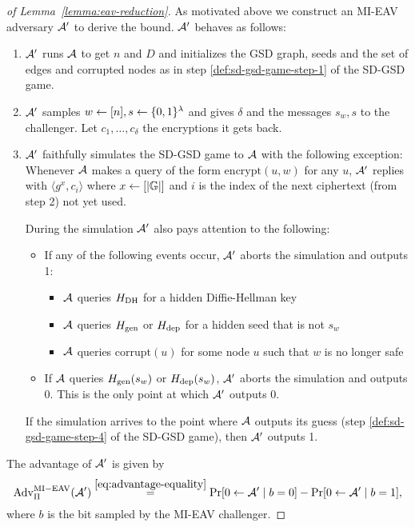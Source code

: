 \begin{proof}[of Lemma~\ref{lemma:eav-reduction}]
	As motivated above we construct an MI-EAV adversary $\mathcal{A}'$ to derive the bound. $\mathcal{A}'$ behaves as follows:
	\begin{enumerate}[1.]
		\item $\mathcal{A}'$ runs $\mathcal{A}$ to get $n$ and $D$ and initializes the GSD graph, seeds and the set of edges and corrupted nodes as in step \ref{def:sd-gsd-game-step-1} of the SD-GSD game.
		\item $\mathcal{A}'$ samples $w \leftarrow [n], s \leftarrow \{0, 1\}^\lambda$ and gives $\delta$ and the messages $s_w, s$ to the challenger. Let $c_1, \ldots, c_\delta$ the encryptions it gets back.
		\item $\mathcal{A}'$ faithfully simulates the SD-GSD game to $\mathcal{A}$ with the following exception: Whenever $\mathcal{A}$ makes a query of the form $\mathrm{encrypt}(u, w)$ for any $u$, $\mathcal{A}'$ replies with $\langle g^x, c_i \rangle$ where $x \leftarrow [\lvert\mathbb{G}\rvert]$ and $i$ is the index of the next ciphertext (from step 2) not yet used.

		      During the simulation $\mathcal{A}'$ also pays attention to the following:
		      \begin{itemize}
			      \item If any of the following events occur, $\mathcal{A}'$ aborts the simulation and outputs 1:
			            \begin{itemize}
				            \item $\mathcal{A}$ queries $H_\mathrm{DH}$ for a hidden Diffie-Hellman key
				            \item $\mathcal{A}$ queries $H_\mathrm{gen}$ or $H_\mathrm{dep}$ for a hidden seed that is not $s_w$
				            \item $\mathcal{A}$ queries $\mathrm{corrupt}(u)$ for some node $u$ such that $w$ is no longer safe
			            \end{itemize}
			      \item If $\mathcal{A}$ queries $H_\mathrm{gen}(s_w)$ or $H_\mathrm{dep}(s_w)$, $\mathcal{A}'$ aborts the simulation and outputs 0. This is the only point at which $\mathcal{A}'$ outputs 0.
		      \end{itemize}

		      If the simulation arrives to the point where $\mathcal{A}$ outputs its guess (step \ref{def:sd-gsd-game-step-4} of the SD-GSD game), then $\mathcal{A}'$ outputs 1.
	\end{enumerate}

	The advantage of $\mathcal{A}'$ is given by
	\begin{equation} \label{eq:lemma-eav-reduction-advantage}
		\mathrm{Adv}_{\Pi}^{\mathrm{MI-EAV}}(\adv') \stackrel{\eqref{eq:advantage-equality}}{=}  \pr{0 \from \adv' \mid b = 0} - \pr{0 \from \adv' \mid b = 1},
	\end{equation}
	where $b$ is the bit sampled by the MI-EAV challenger.



\end{proof}

